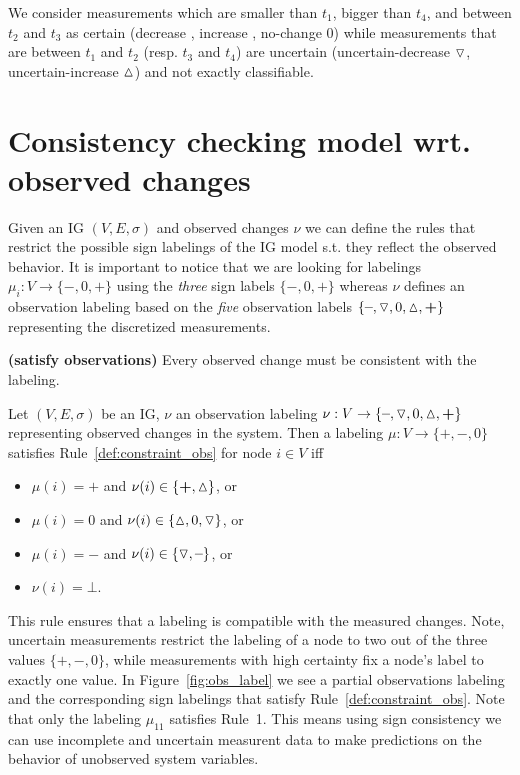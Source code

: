 We consider measurements which are smaller than $t_1$, bigger than $t_4$, and between $t_2$ and $t_3$
 as certain (decrease \minus, increase \plus, no-change 0)
 while measurements that are between $t_1$ and $t_2$ (resp. $t_3$ and $t_4$) are uncertain
 (uncertain-decrease $\triangledown$, uncertain-increase $\vartriangle$) and not exactly classifiable. 

\section*{Consistency checking model wrt. observed changes}
 
Given an IG $(V,E,\sigma)$ 
 and observed changes $\nu$ 
 we can define the rules that restrict the possible sign labelings of the IG model s.t. they reflect the observed behavior.
It is important to notice that we are looking for labelings $\mu_i: V \rightarrow \{ \minus, 0, \plus \}$
 using the \emph{three} sign labels $\{\minus,0,\plus\}$
 whereas $\nu$ defines an observation labeling
 based on the \emph{five} observation labels  $\{ \minus, \uncertaindecrease, 0, \uncertainincrease, \plus \}$
 representing the discretized measurements.

\begin{srule}\label{def:constraint_obs}{\bf (satisfy observations)}
Every observed change must be consistent with the labeling.

Let $(V,E,\sigma)$ be an IG, $\nu$ an observation labeling $\nu: V \rightarrow \{ \minus, \uncertaindecrease, 0, \uncertainincrease, \plus \}$
 representing observed changes in the system.
Then a labeling $\mu : V \rightarrow \{\plus,\minus,0\}$ satisfies Rule~\ref{def:constraint_obs} for node $i\in V$
 iff
 \begin{itemize}
  \item $\mu(i)=\plus$ and $\nu(i)\in \{ \plus, \uncertainincrease \}$, or
  \item $\mu(i)=0$ and $\nu(i)\in \{ \vartriangle, 0, \triangledown\}$, or
  \item $\mu(i)=\minus$ and $\nu(i) \in \{ \uncertaindecrease, \minus \}$, or
  \item $\nu(i)= \bot$.  
 \end{itemize}

\end{srule}
%
This rule ensures that a labeling is compatible with the measured changes.
Note, uncertain measurements restrict the labeling of a node to two out of the three values $\{\plus, \minus, 0\}$,
while measurements with high certainty fix a node's label to exactly one value.
In Figure~\ref{fig:obs_label} we see a partial observations labeling and the corresponding sign labelings 
 that satisfy Rule~\ref{def:constraint_obs}.
Note that only the labeling $\mu_{11}$ satisfies Rule~1.
This means using sign consistency we can use incomplete and uncertain measurent data to make predictions on the behavior of unobserved system variables.

